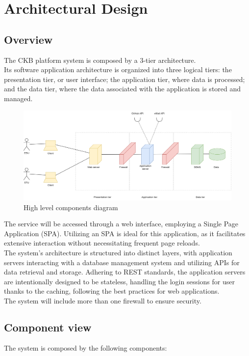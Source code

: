 \chapter{Architectural Design}

\section{Overview}
The CKB platform system is composed by a 3-tier architecture.\\
Its software application architecture is organized into three logical tiers: the presentation tier, or user interface; the application tier, where data is processed; and the data tier, where the data associated with the application is stored and managed.

\begin{figure}[H]
    \centering
    \includegraphics[width=\textwidth]{images/diagrams/high_level_diagram.png}
    \caption{High level components diagram}
\end{figure}

The service will be accessed through a web interface, employing a Single Page Application (SPA). Utilizing an SPA is ideal for this application, as it facilitates extensive interaction without necessitating frequent page reloads.\\
The system's architecture is structured into distinct layers, with application servers interacting with a database management system and utilizing APIs for data retrieval and storage. Adhering to REST standards, the application servers are intentionally designed to be stateless, handling the login sessions for user thanks to the caching, following the best practices for web applications.\\
The system will include more than one firewall to ensure security.\\

\section{Component view}
The system is composed by the following components:

